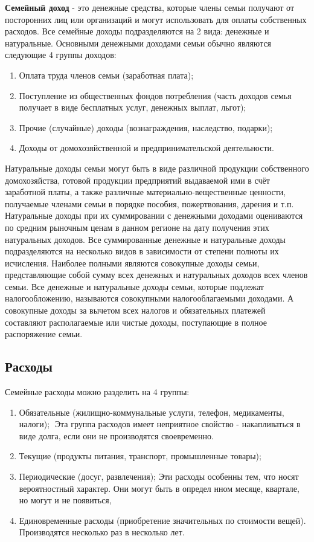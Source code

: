 \textbf{Семейный доход} - это денежные средства, которые члены семьи получают
от посторонних лиц или организаций и могут использовать для оплаты собственных расходов. Все семейные доходы подразделяются на 2 вида:
денежные и натуральные. Основными денежными доходами семьи обычно
являются следующие 4 группы доходов:
\begin{enumerate}
\item Оплата труда членов семьи (заработная плата);
\item Поступление из общественных фондов потребления (часть доходов семья получает в виде бесплатных услуг, денежных выплат, льгот);
\item Прочие (случайные) доходы (вознаграждения, наследство, подарки);
\item Доходы от домохозяйственной и предпринимательской деятельности.
\end{enumerate}
Натуральные доходы семьи могут быть в виде различной продукции собственного домохозяйства, готовой продукции предприятий выдаваемой ими
в счёт заработной платы, а также различные материально-вещественные ценности, получаемые членами семьи в порядке пособия, пожертвования, дарения и т.п. Натуральные доходы при их суммировании с денежными доходами
оцениваются по средним рыночным ценам в данном регионе на дату получения этих натуральных доходов.
Все суммированные денежные и натуральные доходы подразделяются на
несколько видов в зависимости от степени полноты их исчисления. Наиболее
полными являются совокупные доходы семьи, представляющие собой сумму всех денежных и натуральных доходов всех членов семьи. Все денежные
и натуральные доходы семьи, которые подлежат налогообложению, называются совокупными налогооблагаемыми доходами. А совокупные доходы за
вычетом всех налогов и обязательных платежей составляют располагаемые
или чистые доходы, поступающие в полное распоряжение семьи.

\subsection{Расходы}
Семейные расходы можно разделить на 4 группы:
\begin{enumerate}
\item Обязательные (жилищно-коммунальные услуги, телефон, медикаменты,
налоги);
Эта группа расходов имеет неприятное свойство - накапливаться в виде
долга, если они не производятся своевременно.
\item Текущие (продукты питания, транспорт, промышленные товары);
\item Периодические (досуг, развлечения); Эти расходы особенны тем, что носят вероятностный характер. Они могут быть в определ нном месяце, квартале, но могут и не появиться,
\item Единовременные расходы (приобретение значительных по стоимости вещей).
Производятся несколько раз в несколько лет.
\end{enumerate}

